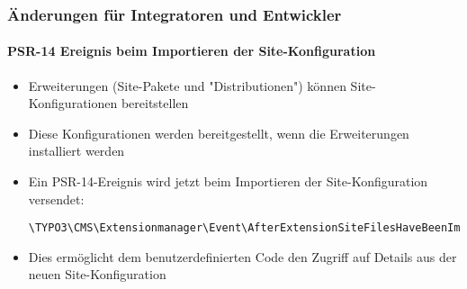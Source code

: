 %

\begin{frame}[fragile]
	\frametitle{Änderungen für Integratoren und Entwickler}
	\framesubtitle{PSR-14 Ereignis beim Importieren der Site-Konfiguration}


	\begin{itemize}
		\item Erweiterungen (Site-Pakete und "Distributionen") können Site-Konfigurationen bereitstellen
		\item Diese Konfigurationen werden bereitgestellt, wenn die Erweiterungen installiert werden
		\item Ein PSR-14-Ereignis wird jetzt beim Importieren der Site-Konfiguration versendet:
\begin{lstlisting}
\TYPO3\CMS\Extensionmanager\Event\AfterExtensionSiteFilesHaveBeenImportedEvent
\end{lstlisting}
		\item Dies ermöglicht dem benutzerdefinierten Code den Zugriff auf Details aus der neuen Site-Konfiguration
	\end{itemize}
\end{frame}

